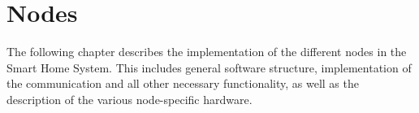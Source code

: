 \chapter{Nodes} \label{sec:nodes}
The following chapter describes the implementation of the different nodes in the 
Smart Home System. This includes general software structure, implementation of the
communication and all other necessary functionality, as well as the description of
the various node-specific hardware.  









    
